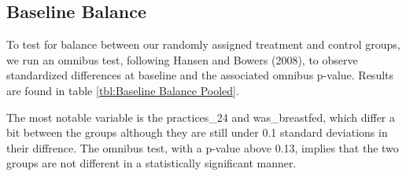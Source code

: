 \documentclass{article}
\begin{document}



\subsection*{Baseline Balance}

To test for balance between our randomly assigned treatment and control groups, we run an omnibus test, following Hansen and Bowers (2008), to observe standardized differences at baseline and the associated omnibus p-value. Results are found in table \ref{tbl:Baseline Balance Pooled}.

The most notable variable is the practices\_24 and was\_breastfed, which differ a bit between the groups although they are still under 0.1 standard deviations in their diffrence. The omnibus test, with a p-value above 0.13, implies that the two groups are not different in a statistically significant manner.
\end{document}
